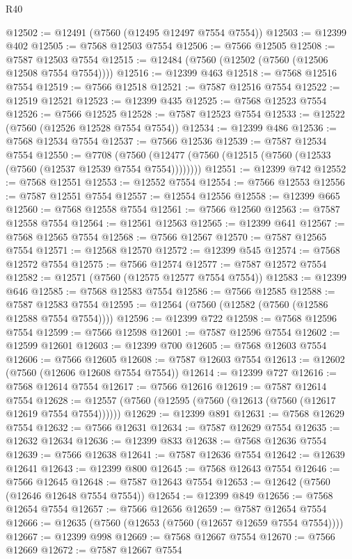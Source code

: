 \begin{lexlean}{R40}
\begin{coremodule}
@12502 := @12491 (@7560 (@12495 @12497 @7554 @7554))
@12503 := @12399 @402
@12505 := @7568 @12503 @7554
@12506 := @7566 @12505
@12508 := @7587 @12503 @7554
@12515 := @12484 (@7560 (@12502 (@7560 (@12506 @12508 @7554 @7554))))
@12516 := @12399 @463
@12518 := @7568 @12516 @7554
@12519 := @7566 @12518
@12521 := @7587 @12516 @7554
@12522 := @12519 @12521
@12523 := @12399 @435
@12525 := @7568 @12523 @7554
@12526 := @7566 @12525
@12528 := @7587 @12523 @7554
@12533 := @12522 (@7560 (@12526 @12528 @7554 @7554))
@12534 := @12399 @486
@12536 := @7568 @12534 @7554
@12537 := @7566 @12536
@12539 := @7587 @12534 @7554
@12550 := @7708
    (@7560 (@12477 (@7560 (@12515 (@7560 (@12533 (@7560 (@12537 @12539 @7554 @7554))))))))
@12551 := @12399 @742
@12552 := @7568 @12551
@12553 := @12552 @7554
@12554 := @7566 @12553
@12556 := @7587 @12551 @7554
@12557 := @12554 @12556
@12558 := @12399 @665
@12560 := @7568 @12558 @7554
@12561 := @7566 @12560
@12563 := @7587 @12558 @7554
@12564 := @12561 @12563
@12565 := @12399 @641
@12567 := @7568 @12565 @7554
@12568 := @7566 @12567
@12570 := @7587 @12565 @7554
@12571 := @12568 @12570
@12572 := @12399 @545
@12574 := @7568 @12572 @7554
@12575 := @7566 @12574
@12577 := @7587 @12572 @7554
@12582 := @12571 (@7560 (@12575 @12577 @7554 @7554))
@12583 := @12399 @646
@12585 := @7568 @12583 @7554
@12586 := @7566 @12585
@12588 := @7587 @12583 @7554
@12595 := @12564 (@7560 (@12582 (@7560 (@12586 @12588 @7554 @7554))))
@12596 := @12399 @722
@12598 := @7568 @12596 @7554
@12599 := @7566 @12598
@12601 := @7587 @12596 @7554
@12602 := @12599 @12601
@12603 := @12399 @700
@12605 := @7568 @12603 @7554
@12606 := @7566 @12605
@12608 := @7587 @12603 @7554
@12613 := @12602 (@7560 (@12606 @12608 @7554 @7554))
@12614 := @12399 @727
@12616 := @7568 @12614 @7554
@12617 := @7566 @12616
@12619 := @7587 @12614 @7554
@12628 := @12557 (@7560 (@12595 (@7560 (@12613 (@7560 (@12617 @12619 @7554 @7554))))))
@12629 := @12399 @891
@12631 := @7568 @12629 @7554
@12632 := @7566 @12631
@12634 := @7587 @12629 @7554
@12635 := @12632 @12634
@12636 := @12399 @833
@12638 := @7568 @12636 @7554
@12639 := @7566 @12638
@12641 := @7587 @12636 @7554
@12642 := @12639 @12641
@12643 := @12399 @800
@12645 := @7568 @12643 @7554
@12646 := @7566 @12645
@12648 := @7587 @12643 @7554
@12653 := @12642 (@7560 (@12646 @12648 @7554 @7554))
@12654 := @12399 @849
@12656 := @7568 @12654 @7554
@12657 := @7566 @12656
@12659 := @7587 @12654 @7554
@12666 := @12635 (@7560 (@12653 (@7560 (@12657 @12659 @7554 @7554))))
@12667 := @12399 @998
@12669 := @7568 @12667 @7554
@12670 := @7566 @12669
@12672 := @7587 @12667 @7554

\end{coremodule}
\end{lexlean}

